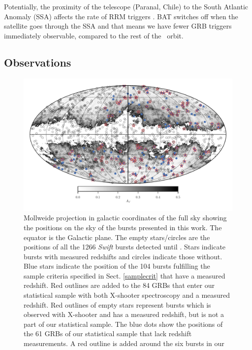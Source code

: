 \documentclass{aa}    %
\begin{document}
Potentially, the proximity of the telescope (Paranal, Chile) to the South
Atlantic Anomaly (SSA) affects the rate of RRM triggers \citep{Greiner2011}. BAT
switches off when the satellite goes through the SSA and that means we have
fewer GRB triggers immediately observable, compared to the rest of
the \swift~orbit.


\subsection{Observations} \label{obs}


\begin{figure}
	\centerline{\includegraphics{figures/skymap.pdf}} \caption{Mollweide projection
	in galactic coordinates of the full sky showing the positions on the sky of the
	bursts presented in this work. The equator is the Galactic plane. The empty
	stars/circles are the positions of all the 1266 \textit{Swift} bursts detected
	until \termdate. Stars indicate bursts with measured redshifts and circles
	indicate those without. Blue stars indicate the position of the 104 bursts
	fulfilling the sample criteria specified in Sect. \ref{samplecrit} that have a
	measured redshift. Red outlines are added to the 84 GRBs that enter our
	statistical sample with both X-shooter spectroscopy and a measured redshift.
	Red outlines of empty stars represent bursts which is observed with X-shooter
	and has a measured redshift, but is not a part of our statistical sample. The
	blue dots show the positions of the 61 GRBs of our statistical sample that lack
	redshift measurements. A red outline is added around the six bursts in our
}
\end{figure}
\end{document}
